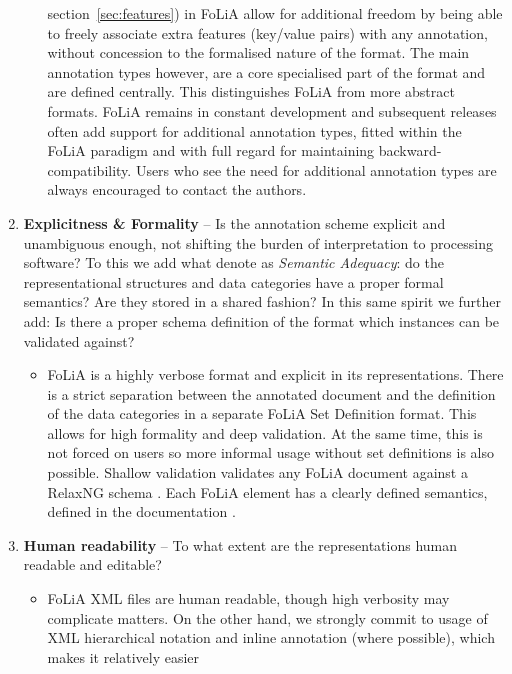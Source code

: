 \documentclass[a4paper,10pt,twoside]{article}
\begin{document}
\begin{enumerate}
\begin{itemize}
      section~\ref{sec:features}) in FoLiA allow for additional freedom by
      being able to freely associate extra features (key/value pairs) with any
      annotation, without concession to the formalised nature of the format.
      The main annotation types however, are a core specialised part of the format and are
      defined centrally. This distinguishes FoLiA from more abstract formats.
      FoLiA remains in constant development and subsequent releases often add
      support for additional annotation types, fitted within the FoLiA paradigm
      and with full regard for maintaining backward-compatibility. Users who
      see the need for additional annotation types are always encouraged to
      contact the authors.
  \end{itemize}
\item \textbf{Explicitness \& Formality} -- Is the annotation scheme explicit
  and unambiguous enough, not shifting the burden of interpretation to
  processing software? To this we add what  denote as
  \emph{Semantic Adequacy}: do the representational structures and data
  categories have a proper formal semantics? Are they stored in a shared
  fashion? In this same spirit we further add: Is there a proper schema definition of the
  format which instances can be validated against?
  \begin{itemize}
    \item[] FoLiA is a highly verbose format and explicit in its representations.
      There is a strict separation between the annotated document and the
      definition of the data categories in a separate FoLiA Set Definition
      format. This allows for high formality and deep validation. At the same
      time, this is not forced on users so more informal usage without set
      definitions is also possible. Shallow validation validates any FoLiA
      document against a RelaxNG schema \cite{RELAXNG}. Each FoLiA element has a clearly
      defined semantics, defined in the documentation \cite{FOLIA}.
  \end{itemize}
\item \textbf{Human readability} -- To what extent are the representations human readable and editable?
\begin{itemize}
    \item[] FoLiA XML files are human readable, though high verbosity may
      complicate matters. On the other hand, we strongly commit to usage of XML hierarchical notation
      and inline annotation (where possible), which makes it relatively easier

\end{itemize}
\end{enumerate}
\end{document}
